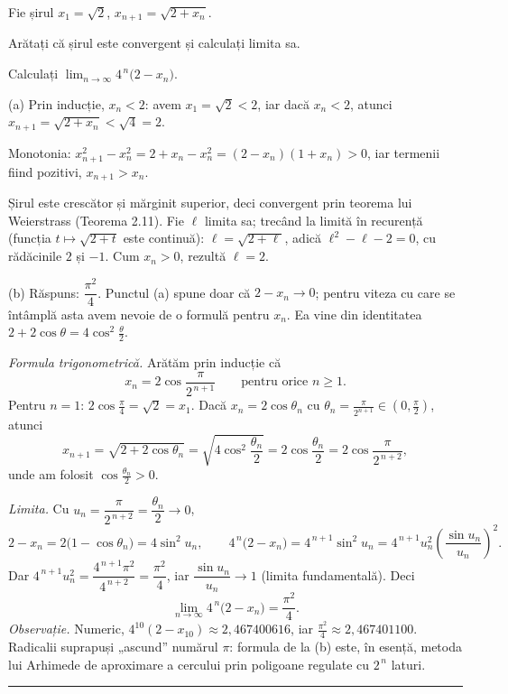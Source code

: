 Fie șirul $x_1=\sqrt{2}$, $x_{n+1}=\sqrt{2+x_n}$.
\begin{parti}
  \item Arătați că șirul este convergent și calculați limita sa.
  \item Calculați $\displaystyle\lim_{n\to\infty}4^{\,n}\bigl(2-x_n\bigr)$.
\end{parti}
\sol (a) Prin inducție, $x_n<2$: avem $x_1=\sqrt2<2$, iar dacă $x_n<2$, atunci $x_{n+1}=\sqrt{2+x_n}<\sqrt4=2$.

Monotonia: $x_{n+1}^2-x_n^2=2+x_n-x_n^2=(2-x_n)(1+x_n)>0$, iar termenii fiind pozitivi, $x_{n+1}>x_n$.

Șirul este crescător și mărginit superior, deci convergent prin teorema lui Weierstrass (Teorema 2.11). Fie $\ell$ limita sa; trecând la limită în recurență (funcția $t\mapsto\sqrt{2+t}$ este continuă): $\ell=\sqrt{2+\ell}$, adică $\ell^2-\ell-2=0$, cu rădăcinile $2$ și $-1$. Cum $x_n>0$, rezultă $\ell=2$.

(b) Răspuns: $\dfrac{\pi^{2}}{4}$. Punctul (a) spune doar că $2-x_n\to0$; pentru viteza cu care se întâmplă asta avem nevoie de o formulă pentru $x_n$. Ea vine din identitatea $2+2\cos\theta=4\cos^{2}\frac\theta2$.

\emph{Formula trigonometrică.} Arătăm prin inducție că
\[ x_n=2\cos\frac{\pi}{2^{\,n+1}}\qquad\text{pentru orice }n\ge1 . \]
Pentru $n=1$: $2\cos\frac\pi4=\sqrt2=x_1$. Dacă $x_n=2\cos\theta_n$ cu $\theta_n=\frac{\pi}{2^{n+1}}\in\left(0,\frac\pi2\right)$, atunci
\[ x_{n+1}=\sqrt{2+2\cos\theta_n}=\sqrt{4\cos^{2}\frac{\theta_n}{2}}=2\cos\frac{\theta_n}{2}=2\cos\frac{\pi}{2^{\,n+2}} , \]
unde am folosit $\cos\frac{\theta_n}{2}>0$.

\emph{Limita.} Cu $u_n=\dfrac{\pi}{2^{\,n+2}}=\dfrac{\theta_n}{2}\to0$,
\[ 2-x_n=2\bigl(1-\cos\theta_n\bigr)=4\sin^{2}u_n , \qquad 4^{\,n}\bigl(2-x_n\bigr)=4^{\,n+1}\sin^{2}u_n=4^{\,n+1}u_n^{2}\left(\frac{\sin u_n}{u_n}\right)^{2} . \]
Dar $4^{\,n+1}u_n^{2}=\dfrac{4^{\,n+1}\pi^{2}}{4^{\,n+2}}=\dfrac{\pi^{2}}{4}$, iar $\dfrac{\sin u_n}{u_n}\to1$ (limita fundamentală). Deci
\[ \lim_{n\to\infty}4^{\,n}\bigl(2-x_n\bigr)=\frac{\pi^{2}}{4} . \]
\emph{Observație.} Numeric, $4^{10}(2-x_{10})\approx2{,}467400616$, iar $\frac{\pi^{2}}{4}\approx2{,}467401100$. Radicalii suprapuși „ascund'' numărul $\pi$: formula de la (b) este, în esență, metoda lui Arhimede de aproximare a cercului prin poligoane regulate cu $2^{\,n}$ laturi.
\vspace{1mm}\hrule

